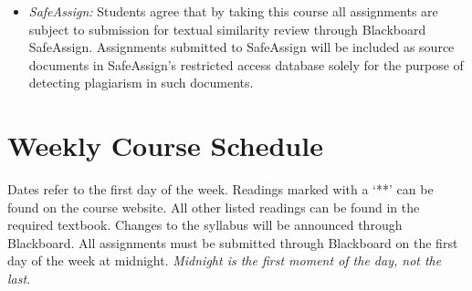 \documentclass[article,oneside]{memoir}
\begin{document}
\begin{itemize}
\item \textit{SafeAssign:} Students agree that by taking this course all assignments are subject to submission for textual similarity review through Blackboard SafeAssign. Assignments submitted to SafeAssign will be included as source documents in SafeAssign's restricted access database solely for the purpose of detecting plagiarism in such documents.  


\end{itemize}




\section{Weekly Course Schedule}
Dates refer to the first day of the week. Readings marked with a `**' can be found on the course website. All other listed readings can be found in the required textbook. Changes to the syllabus will be announced through Blackboard.  All assignments must be submitted through Blackboard on the first day of the week at midnight. \emph{Midnight is the first moment of the day, not the last.}   \newline
\end{document}
